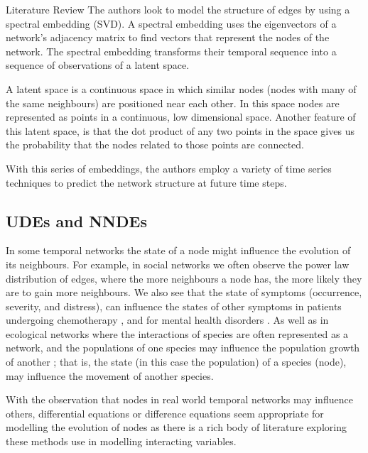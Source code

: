 \documentclass[12pt]{amsart}
\begin{document}
\begin{section}{Literature Review}
        The authors look to model the structure of edges by using a spectral embedding (SVD). A spectral embedding uses the eigenvectors of a network's adjacency matrix to find vectors that represent the nodes of the network. The spectral embedding transforms their temporal sequence into a sequence of observations of a latent space. 
        
        A latent space is a continuous space in which similar nodes (nodes with many of the same neighbours) are positioned near each other. In this space nodes are represented as points in a continuous, low dimensional space. Another feature of this latent space, is that the dot product of any two points in the space gives us the probability that the nodes related to those points are connected. 
        
        With this series of embeddings, the authors employ a variety of time series techniques to predict the network structure at future time steps.

    \subsection{UDEs and NNDEs}
        In some temporal networks the state of a node might influence the evolution of its neighbours. For example, in social networks we often observe the power law distribution of edges, where the more neighbours a node has, the more likely they are to gain more neighbours\cite{zhao2012multi,garg2009evolution}. We also see that the state of symptoms (occurrence, severity, and distress), can influence the states of other symptoms in patients undergoing chemotherapy \cite{papachristou2019network,kalantari2022network}, and for mental health disorders \cite{contreras2020temporal}. As well as in ecological networks where the interactions of species are often represented as a network, and the populations of one species may influence the population growth of another \cite{elton2001animal,volterra1927variazioni}; that is, the state (in this case the population) of a species (node), may influence the movement of another species.
        
        With the observation that nodes in real world temporal networks may influence others, differential equations or difference equations seem appropriate for modelling the evolution of nodes as there is a rich body of literature exploring these methods use in modelling interacting variables. 
        

\end{section}
\end{document}
